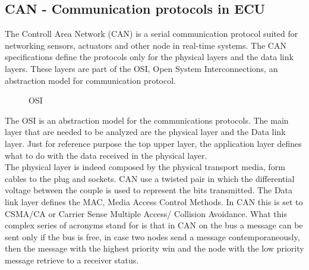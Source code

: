 \documentclass[../main.tex]{subfiles}
\begin{document}
\subsection{CAN - Communication protocols in ECU}
The Controll Area Network (CAN) is a serial communication protocol suited for networking sensors, actuators and other node in real-time systems. The CAN specifications define the protocols only for the physical layers and the data link layers. These layers are part of the OSI, Open System Interconnections, an abstraction model for communication protocol. 
\begin{figure}[h]
    \centering
{}
    \caption{OSI}
    \label{fig:ECUstructure}
\end{figure}
The OSI is an abstraction model for the communications protocols. The main layer that are needed to be analyzed are the physical layer and the Data link layer. Just for reference purpose the top upper layer, the application layer defines what to do with the data received in the physical layer.\\
The physical layer is indeed composed by the physical transport media, form cables to the plug and sockets. CAN use a twisted pair in which the differential voltage between the couple is used to represent the bits transmitted. The Data link layer defines the MAC, Media Access Control Methods. In CAN this is set to CSMA/CA or Carrier Sense Multiple Access/ Collision Avoidance. What this complex series of acronyms stand for is that in CAN on the bus a message can be sent only if the bus is free, in case two nodes send a message contemporaneously, then the message with the highest priority win and the node with the low priority message retrieve to a receiver status.
\end{document}

